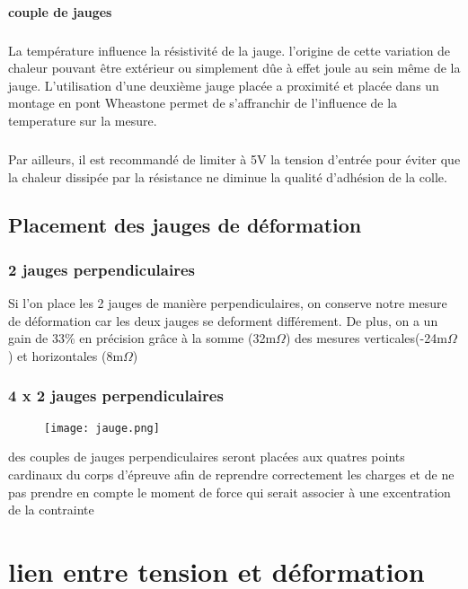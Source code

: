 \documentclass[10pt,a4paper]{report}
\begin{document}
\subsubsection*{couple de jauges}
\paragraph{}La température influence la résistivité de la jauge. l'origine de cette variation de chaleur pouvant être extérieur ou simplement dûe à effet joule au sein même de la jauge. L'utilisation d'une deuxième jauge placée a proximité et placée dans un montage en pont Wheastone permet de s'affranchir de l'influence de la temperature sur la mesure.
\paragraph{}Par ailleurs, il est recommandé de limiter à 5V la tension d'entrée pour éviter que la chaleur dissipée par la résistance ne diminue la qualité d'adhésion de la colle.
\section{Placement des jauges de déformation}
\subsection{2 jauges perpendiculaires}
Si l'on place les 2 jauges de manière perpendiculaires, on conserve notre mesure de déformation car les deux jauges se deforment différement. De plus, on a un gain de 33\% en précision grâce à la somme (32m$\Omega$) des mesures verticales(-24m$\Omega$) et horizontales (8m$\Omega$)
\subsection{4 x 2 jauges perpendiculaires}
\begin{figure}
\texttt{[image: jauge.png]} 
\end{figure}
des couples de jauges perpendiculaires seront placées aux quatres points cardinaux du corps d'épreuve afin de reprendre correctement les charges et de ne pas prendre en compte le moment de force qui serait associer à une excentration de la contrainte
\chapter{lien entre tension et déformation}
\end{document}
